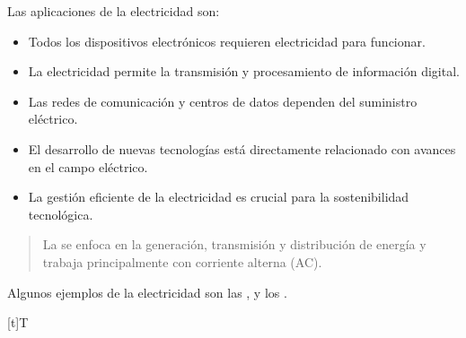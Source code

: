 \documentclass[letterpaper,10pt,spanish]{sphinxmanual}
\let\sphinxpxdimen\pdfpxdimen\else\newdimen\sphinxpxdimen
\begin{document}
\sphinxAtStartPar
Las aplicaciones de la electricidad son:
\begin{itemize}
\item {} 
\sphinxAtStartPar
{} Todos los dispositivos electrónicos requieren electricidad para funcionar.

\item {} 
\sphinxAtStartPar
{} La electricidad permite la transmisión y procesamiento de información digital.

\item {} 
\sphinxAtStartPar
{} Las redes de comunicación y centros de datos dependen del suministro eléctrico.

\item {} 
\sphinxAtStartPar
{} El desarrollo de nuevas tecnologías está directamente relacionado con avances en el campo eléctrico.

\item {} 
\sphinxAtStartPar
{} La gestión eficiente de la electricidad es crucial para la sostenibilidad tecnológica.

\end{itemize}
\begin{quote}

\sphinxAtStartPar
La  se enfoca en la generación, transmisión y distribución de energía y trabaja principalmente con corriente alterna (AC).
\end{quote}

\sphinxAtStartPar
Algunos ejemplos de la electricidad son las ,  y los .


\begin{savenotes}\sphinxattablestart
\sphinxthistablewithglobalstyle
\centering
\begin{tabulary}{\linewidth}[t]{T}
\sphinxtoprule
\sphinxtableatstartofbodyhook

\begin{sphinxfigure-in-table}
\centering
\capstart
\noindent\sphinxincludegraphics[width=300\sphinxpxdimen]{{image032}.png}
\label{\detokenize{1_guias/10informatica/G1004:id3}}\end{sphinxfigure-in-table}\relax
\\
\sphinxbottomrule
\end{tabulary}
\sphinxtableafterendhook\par
\sphinxattableend\end{savenotes}
\end{document}
